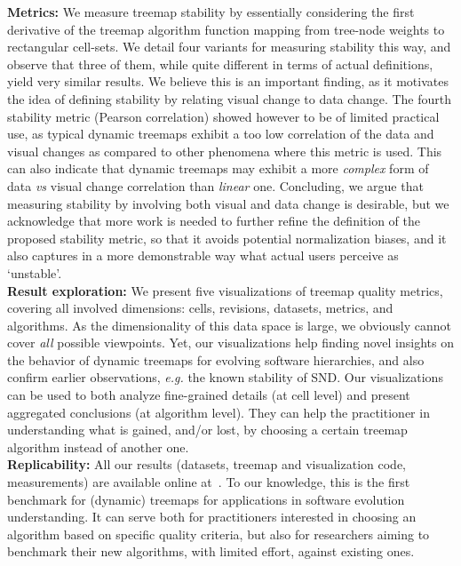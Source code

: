 \noindent\textbf{Metrics:} We measure treemap stability by essentially considering the first derivative of the treemap algorithm function mapping from tree-node weights to rectangular cell-sets. We detail four variants for measuring stability this way, and observe that three of them, while quite different in terms of actual definitions, yield very similar results. We believe this is an important finding, as it motivates the idea of defining stability by relating visual change to data change. The fourth stability metric (Pearson correlation) showed however to be of limited practical use, as typical dynamic treemaps exhibit a too low correlation of the data and visual changes as compared to other phenomena where this metric is used. This can also indicate that dynamic treemaps may exhibit a more \emph{complex} form of data \emph{vs} visual change correlation than \emph{linear} one. 
Concluding, we argue that measuring stability by involving both visual and data change is desirable, but we acknowledge that more work is needed to further refine the definition of the proposed stability metric, so that it avoids potential normalization biases, and it also captures in a more demonstrable way what actual users perceive as `unstable'.\\

\noindent\textbf{Result exploration:} We present five visualizations of treemap quality metrics, covering all involved dimensions: cells, revisions, datasets, metrics, and algorithms. As the dimensionality of this data space is large, we obviously cannot cover \emph{all} possible viewpoints. Yet, our visualizations help finding novel insights on the behavior of dynamic treemaps for evolving software hierarchies, and also confirm earlier observations, \emph{e.g.} the known stability of SND. Our visualizations can be used to both analyze fine-grained details (at cell level) and present aggregated conclusions (at algorithm level). They can help the practitioner in understanding what is gained, and/or lost, by choosing a certain treemap algorithm instead of another one.\\

\noindent\textbf{Replicability:} All our results (datasets, treemap and visualization code, measurements) are available online at~\citep{benchmark}. To our knowledge, this is the first benchmark for (dynamic) treemaps for applications in software evolution understanding. It can serve both for practitioners interested in choosing an algorithm based on specific quality criteria, but also for researchers aiming to benchmark their new algorithms, with limited effort, against existing ones.\\

